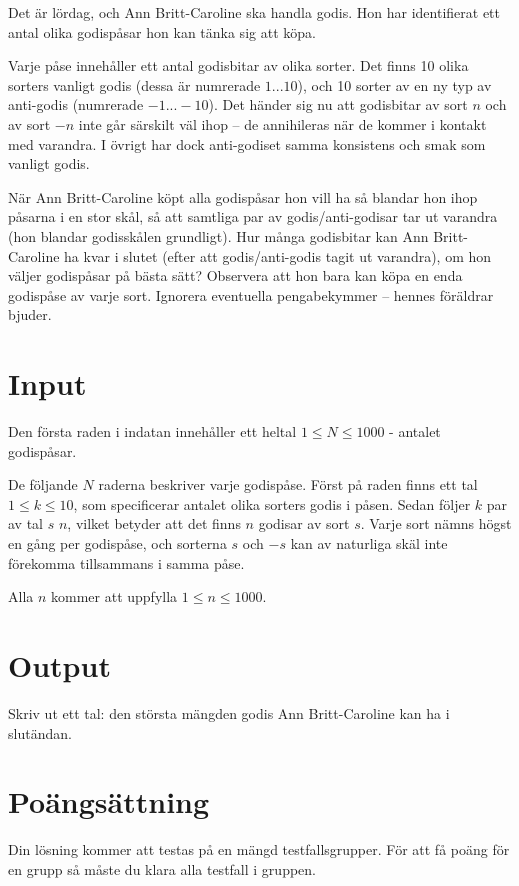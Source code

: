 Det är lördag, och Ann Britt-Caroline ska handla godis. Hon har identifierat ett antal olika godispåsar hon kan tänka sig att köpa.

Varje påse innehåller ett antal godisbitar av olika sorter. Det finns 10 olika sorters vanligt godis (dessa är numrerade $1...10$), och 10 sorter av en ny typ av anti-godis (numrerade $-1...-10$). Det händer sig nu att godisbitar av sort $n$ och av sort $-n$ inte går särskilt väl ihop -- de annihileras när de kommer i kontakt med varandra. I övrigt har dock anti-godiset samma konsistens och smak som vanligt godis.

När Ann Britt-Caroline köpt alla godispåsar hon vill ha så blandar hon ihop påsarna i en stor skål, så att samtliga par av godis/anti-godisar tar ut varandra (hon blandar godisskålen grundligt). Hur många godisbitar kan Ann Britt-Caroline ha kvar i slutet (efter att godis/anti-godis tagit ut varandra), om hon väljer godispåsar på bästa sätt? Observera att hon bara kan köpa en enda godispåse av varje sort. Ignorera eventuella pengabekymmer -- hennes föräldrar bjuder.

\section*{Input}
Den första raden i indatan innehåller ett heltal $1 \le N \le 1000$ - antalet godispåsar.

De följande $N$ raderna beskriver varje godispåse.
Först på raden finns ett tal $1 \le k \le 10$, som specificerar antalet olika sorters godis i påsen.
Sedan följer $k$ par av tal $s$ $n$, vilket betyder att det finns $n$ godisar av sort $s$.
Varje sort nämns högst en gång per godispåse, och sorterna $s$ och $-s$ kan av naturliga skäl inte förekomma tillsammans i samma påse.

Alla $n$ kommer att uppfylla $1 \le n \le 1000$.

\section*{Output}
Skriv ut ett tal: den största mängden godis Ann Britt-Caroline kan ha i slutändan.

\section*{Poängsättning}
Din lösning kommer att testas på en mängd testfallsgrupper. För att få poäng för en grupp så måste du klara alla testfall i gruppen.

